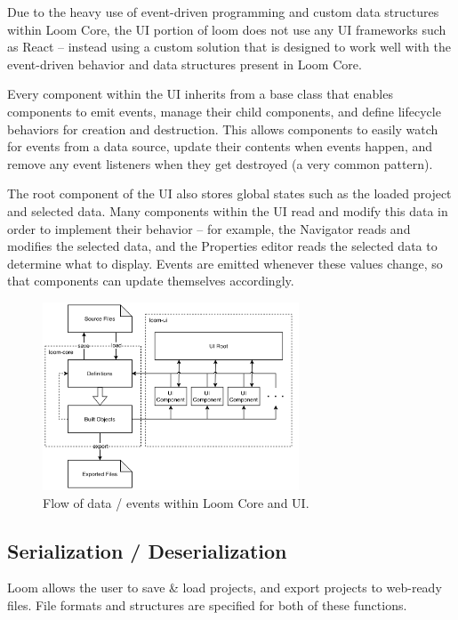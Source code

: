\documentclass[conference, letterpaper]{IEEEtran}
\begin{document}
Due to the heavy use of event-driven programming and custom data structures within Loom Core, the UI portion of loom does not use any UI frameworks such as React\cite{React} -- instead using a custom solution that is designed to work well with the event-driven behavior and data structures present in Loom Core.

Every component within the UI inherits from a base class that enables components to emit events, manage their child components, and define lifecycle behaviors for creation and destruction. This allows components to easily watch for events from a data source, update their contents when events happen, and remove any event listeners when they get destroyed (a very common pattern).

The root component of the UI also stores global states such as the loaded project and selected data. Many components within the UI read and modify this data in order to implement their behavior -- for example, the Navigator reads and modifies the selected data, and the Properties editor reads the selected data to determine what to display. Events are emitted whenever these values change, so that components can update themselves accordingly.

\begin{figure}[!t]
  \centering
  \includegraphics[width=3in]{../dataflow.png}
  \caption{Flow of data / events within Loom Core and UI.}
  \label{fig:dataflow}
\end{figure}

\subsection{Serialization / Deserialization}
Loom allows the user to save \& load projects, and export projects to web-ready files. File formats and structures are specified for both of these functions.
\end{document}
